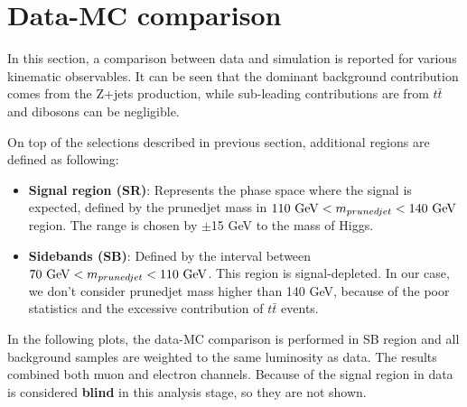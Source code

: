 \newpage
\section{Data-MC comparison}

In this section, a comparison between data and simulation is reported for various kinematic observables. It can be seen that the dominant background contribution comes from the Z+jets production, while sub-leading contributions are from $t\bar{t}$ and dibosons can be negligible.

On top of the selections described in previous section, additional regions are defined as following:

\begin{itemize}
\item \textbf{Signal region (SR)}: Represents the phase space where the signal is expected, defined by the prunedjet mass in $110 \textup{ GeV} < m_{prunedjet} < 140 \textup{ GeV}$ region. The range is chosen by $\pm$15 GeV to the mass of Higgs.
\item \textbf{Sidebands (SB)}: Defined by the interval between $70 \textup{ GeV} < m_{prunedjet} < 110 \textup{ GeV}$. This region is signal-depleted. In our case, we don't consider prunedjet mass higher than 140 GeV, because of the poor statistics and the excessive contribution of $t\bar{t}$ events.
\end{itemize}

In the following plots, the data-MC comparison is performed in SB region and all background samples are weighted to the same luminosity as data. The results combined both muon and electron channels. Because of the signal region in data is considered \textbf{blind} in this analysis stage, so they are not shown.

